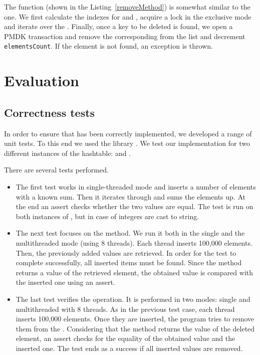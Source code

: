         The \removeMethod function (shown in the Listing~\ref{removeMethod}) is somewhat similar to the \insertMethod one. We first calculate the indexes for \internalHashMap and \Segment, acquire a lock in the exclusive mode and iterate over the \Segment. Finally, once a key to be deleted is found, we open a PMDK transaction and remove the corresponding \SegmentObject from the list and decrement \texttt{elementsCount}. If the element is not found, an exception is thrown.

\section{Evaluation}

\subsection{Correctness tests}
 
    In order to ensure that \PHT has been correctly implemented, we developed a range of unit tests. To this end we used the \GoogleTest library \cite{GoogleTest}. 
    We test our implementation for two different instances of the hashtable: \integersMap and \stringsMap.
    
    There are several tests performed.
    \begin{itemize}
    \item The first test works in single-threaded mode and inserts a number of elements with a known sum. 
        Then it iterates through \PHT and sums the elements up. 
        At the end an assert checks whether the two values are equal. 
        The test is run on both instances of \PHT, but in case of \NvmHashMap\stringsMap integers are cast to string.
    \item The next test focuses on the \getMethod method.
        We run it both in the single and the multithreaded mode (using 8 threads). 
        Each thread inserts 100,000 elements. 
        Then, the previously added values are retrieved. 
        In order for the test to complete successfully, all inserted items must be found. 
        Since the \getMethod method returns a value of the retrieved element, the obtained value is compared with the inserted one using an assert.
    \item The last test verifies the \removeMethod operation. 
        It is performed in two modes: single and multithreaded with 8 threads. 
        As in the previous test case, each thread inserts 100,000 elements. 
        Once they are inserted, the program tries to remove them from the \PHT. 
        Considering that the \removeMethod method returns the value of the deleted element, an assert checks for the equality of the obtained value and the inserted one. 
        The test ends as a success if all inserted values are removed.
    \end{itemize}

